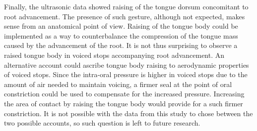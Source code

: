 \documentclass[authoryear, twocolumn]{elsarticle}
\begin{document}
Finally, the ultrasonic data showed raising of the tongue dorsum
concomitant to root advancement. The presence of such gesture, although
not expected, makes sense from an anatomical point of view. Raising of
the tongue body could be implemented as a way to counterbalance the
compression of the tongue mass caused by the advancement of the root. It
is not thus surprising to observe a raised tongue body in voiced stops
accompanying root advancement. An alternative account could ascribe
tongue body raising to aerodynamic properties of voiced stops. Since the
intra-oral pressure is higher in voiced stops due to the amount of air
needed to maintain voicing, a firmer seal at the point of oral
constriction could be used to compensate for the increased pressure.
Increasing the area of contact by raising the tongue body would provide
for a such firmer constriction. It is not possible with the data from
this study to chose between the two possible accounts, so such question
is left to future research.


\end{document}
